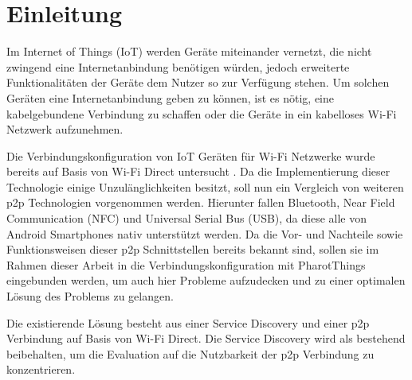 \section{Einleitung}
        Im Internet of Things (IoT) werden Geräte miteinander vernetzt, die nicht zwingend eine Internetanbindung benötigen würden, jedoch erweiterte Funktionalitäten der Geräte dem Nutzer so zur Verfügung stehen. Um solchen Geräten eine Internetanbindung geben zu können, ist es nötig, eine kabelgebundene Verbindung zu schaffen oder die Geräte in ein kabelloses Wi-Fi Netzwerk aufzunehmen.
        
        Die Verbindungskonfiguration von IoT Geräten für Wi-Fi Netzwerke wurde bereits auf Basis von Wi-Fi Direct untersucht \cite{aiProject}. Da die Implementierung dieser Technologie einige Unzulänglichkeiten besitzt, soll nun ein Vergleich von weiteren p2p Technologien vorgenommen werden. Hierunter fallen Bluetooth, Near Field Communication (NFC) und Universal Serial Bus (USB), da diese alle von Android Smartphones nativ unterstützt werden. Da die Vor- und Nachteile sowie Funktionsweisen dieser p2p Schnittstellen bereits bekannt sind, sollen sie im Rahmen dieser Arbeit in die Verbindungskonfiguration mit PharotThings eingebunden werden, um auch hier Probleme aufzudecken und zu einer optimalen Lösung des Problems zu gelangen.
        
        Die existierende Lösung besteht aus einer Service Discovery und einer p2p \linebreak Verbindung auf Basis von Wi-Fi Direct. Die Service Discovery wird als bestehend beibehalten, um die Evaluation auf die Nutzbarkeit der p2p Verbindung zu konzentrieren.

